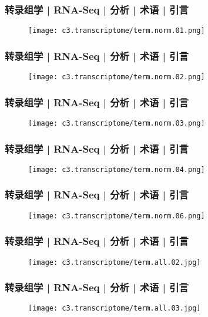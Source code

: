 \begin{frame}
  \frametitle{转录组学 | RNA-Seq | 分析 | 术语 | 引言}
  \begin{figure}
    \centering
    \texttt{[image: c3.transcriptome/term.norm.01.png]}
  \end{figure}
\end{frame}

\begin{frame}
  \frametitle{转录组学 | RNA-Seq | 分析 | 术语 | 引言}
  \begin{figure}
    \centering
    \texttt{[image: c3.transcriptome/term.norm.02.png]}
  \end{figure}
\end{frame}

\begin{frame}
  \frametitle{转录组学 | RNA-Seq | 分析 | 术语 | 引言}
  \begin{figure}
    \centering
    \texttt{[image: c3.transcriptome/term.norm.03.png]}
  \end{figure}
\end{frame}

\begin{frame}
  \frametitle{转录组学 | RNA-Seq | 分析 | 术语 | 引言}
  \begin{figure}
    \centering
    \texttt{[image: c3.transcriptome/term.norm.04.png]}
  \end{figure}
\end{frame}

\begin{frame}
  \frametitle{转录组学 | RNA-Seq | 分析 | 术语 | 引言}
  \begin{figure}
    \centering
    \texttt{[image: c3.transcriptome/term.norm.06.png]}
  \end{figure}
\end{frame}

\begin{frame}
  \frametitle{转录组学 | RNA-Seq | 分析 | 术语 | 引言}
  \begin{figure}
    \centering
    \texttt{[image: c3.transcriptome/term.all.02.jpg]}
  \end{figure}
\end{frame}

\begin{frame}
  \frametitle{转录组学 | RNA-Seq | 分析 | 术语 | 引言}
  \begin{figure}
    \centering
    \texttt{[image: c3.transcriptome/term.all.03.jpg]}
  \end{figure}
\end{frame}

